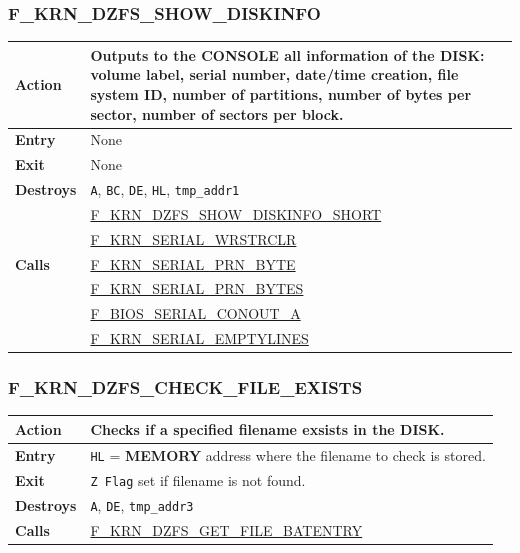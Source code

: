 \documentclass[a4paper,11pt]{article}
\begin{document}
        \subsubsection{F\_KRN\_DZFS\_SHOW\_DISKINFO}
        \label{func:fkrndzfsshowdiskinfo}
        \begin{tabular}{l p{9cm}}
            \hline\textbf{Action}
            & Outputs to the \textbf{CONSOLE} all information of the 
            \textbf{DISK}: volume label, serial number, date/time creation,
            file system ID, number of partitions, number of bytes per sector,
            number of sectors per block.\\
            \hline\textbf{Entry} & None\\
            \hline\textbf{Exit} & None\\
            \hline\textbf{Destroys} & \texttt{A}, \texttt{BC}, \texttt{DE}, 
            \texttt{HL}, \texttt{tmp\_addr1}\\
            \hline\multirow[t]{5}{4em}{\textbf{Calls}}
            & \hyperref[func:fkrndzfsshowdiskinfoshort]{F\_KRN\_DZFS\_SHOW\_DISKINFO\_SHORT}\\
            & \hyperref[func:fkrnserialwrstrclr]{F\_KRN\_SERIAL\_WRSTRCLR}\\
            & \hyperref[func:fkrnserialprnbyte]{F\_KRN\_SERIAL\_PRN\_BYTE}\\
            & \hyperref[func:fkrnserialprnbytes]{F\_KRN\_SERIAL\_PRN\_BYTES}\\
            & \hyperref[func:fbiosserialconouta]{F\_BIOS\_SERIAL\_CONOUT\_A}\\
            & \hyperref[func:fkrnserialemptylines]{F\_KRN\_SERIAL\_EMPTYLINES}\\
            \hline
        \end{tabular}

        \subsubsection{F\_KRN\_DZFS\_CHECK\_FILE\_EXISTS}
        \label{func:fkrndzfscheckfileexists}
        \begin{tabular}{l p{9cm}}
            \hline\textbf{Action}
            & Checks if a specified filename exsists in the \textbf{DISK}.\\
            \hline\textbf{Entry} & \texttt{HL} = \textbf{MEMORY} address where
            the filename to check is stored.\\
            \hline\textbf{Exit} & \texttt{Z Flag} set if filename is not found.\\
            \hline\textbf{Destroys} & \texttt{A}, \texttt{DE}, \texttt{tmp\_addr3}\\
            \hline\textbf{Calls}
            & \hyperref[func:fkrndzfsgetfilebatentry]{F\_KRN\_DZFS\_GET\_FILE\_BATENTRY}\\
            \hline
        \end{tabular}
\end{document}
